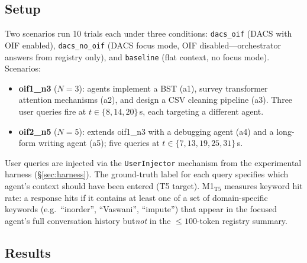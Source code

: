 \documentclass{article}
\begin{document}
\subsection{Setup}

Two scenarios run 10 trials each under three conditions:
\texttt{dacs\_oif} (DACS with OIF enabled),
\texttt{dacs\_no\_oif} (DACS focus mode, OIF disabled---orchestrator
answers from registry only), and
\texttt{baseline} (flat context, no focus mode).
Scenarios:
\begin{itemize}
  \item \textbf{oif1\_n3} ($N=3$): agents implement a BST
  (a1), survey transformer attention mechanisms (a2), and
  design a CSV cleaning pipeline (a3).  Three user queries fire
  at $t\in\{8,14,20\}$\,s, each targeting a different agent.
  \item \textbf{oif2\_n5} ($N=5$): extends oif1\_n3 with a
  debugging agent (a4) and a long-form writing agent (a5); five
  queries at $t\in\{7,13,19,25,31\}$\,s.
\end{itemize}

User queries are injected via the \texttt{UserInjector}
mechanism from the experimental harness (\S\ref{sec:harness}).
The ground-truth label for each query specifies
which agent's context should have been entered (T5 target).
M1$_{\mathrm{T5}}$ measures keyword hit rate: a response hits if it
contains at least one of a set of domain-specific keywords
(e.g.\ ``inorder'', ``Vaswani'', ``impute'') that appear in the
focused agent's full conversation history but\emph{not} in the
${\le}100$-token registry summary.

\subsection{Results}
\end{document}
